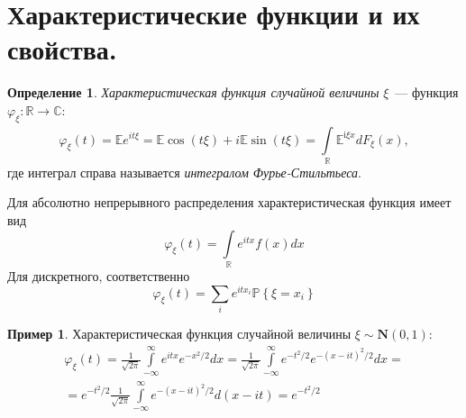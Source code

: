 \documentclass[oneside,final,14pt]{extreport}
\theoremstyle{definition}
\newtheorem{defn}{Определение}[section]
\newtheorem*{exmp}{Пример}
\begin{document}
\section{Характеристические функции и их свойства.}
\begin{defn}
    {\it Характеристическая функция случайной величины} $\xi$~--- функция $\varphi_{\xi}: \mathbb{R} \rightarrow \mathbb{C}$:
    \begin{equation*}
        \varphi_{\xi}(t)
        = \mathbb{E} e^{i t \xi}
        = \mathbb{E} \cos (t \xi)+i \mathbb{E} \sin (t \xi) = \int\limits_{\mathbb{R}}^{} \mathbb{E}^{\mathrm{i} \xi x} d F_{\xi}(x),
    \end{equation*}
    где интеграл справа называется {\it интегралом Фурье-Стильтьеса}.
    
    Для абсолютно непрерывного распределения характеристическая функция имеет вид
    \begin{equation*}
        \varphi_{\xi}(t)=\int\limits_{\mathbb{R}} e^{i t x} f(x) d x
    \end{equation*}
    Для дискретного, соответственно
    \begin{equation*}
        \varphi_{\xi}(t)=\sum_{i} e^{i t x_{i}} \mathbb{P}\left\{\xi=x_{i}\right\}
    \end{equation*}
\end{defn}

\begin{exmp}
    Характеристическая функция случайной величины $\xi \sim \mathbf{N}(0,1)$:
    \begin{multline*}
        \varphi_{\xi}(t) 
        = \frac{1}{\sqrt{2 \pi}} \int\limits_{-\infty}^{\infty} e^{i t x} e^{-x^{2} / 2} d x
        = \frac{1}{\sqrt{2 \pi}} \int\limits_{-\infty}^{\infty} e^{-t^{2} / 2} e^{-(x-i t)^{2} / 2} d x = \\ 
        = e^{-t^{2} / 2} \frac{1}{\sqrt{2 \pi}} \int\limits_{-\infty}^{\infty} e^{-(x-i t)^{2} / 2} d(x-i t)
        = e^{-t^{2} / 2}
    \end{multline*}
\end{exmp}
\end{document}
